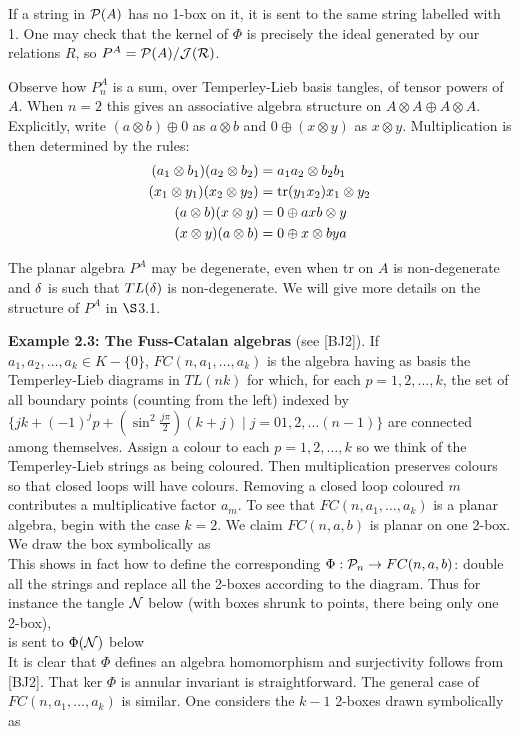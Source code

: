 If a string in $\P(A)$ has no 1-box on it, it is sent to the same
string labelled with 1. One may check that the kernel of $\Phi$ is
precisely the ideal generated by our relations $R$, so
$P^A=\P(A)/\cal J(R)$.

Observe how $P^A_n$ is a sum, over Temperley-Lieb basis tangles, of
tensor powers of $A$. When $n\!=\!2$ this gives an associative
algebra structure on $A\otimes A\oplus A\otimes A$. Explicitly,
write $(a\otimes b)\oplus 0$ as $a\otimes b$ and $0\oplus (x\otimes y)$
as $x\otimes y$. Multiplication is then determined by the rules:
\begin{eqnarray*}
(a_1\otimes b_1)(a_2\otimes b_2) & = a_1a_2\otimes b_2b_1 \\
(x_1\otimes y_1)(x_2\otimes y_2) & = {\op{tr}}(y_1x_2)x_1\otimes
y_2 \\
(a\otimes b)(x\otimes y) & = 0\oplus axb\otimes y \\
(x\otimes y)(a\otimes b) & = 0\oplus x\otimes bya
\end{eqnarray*}

The planar algebra $P^A$ may be degenerate,
even when tr on $A$ is non-degenerate and $\d$ is such that
$TL(\d)$ is non-degenerate. We will give more details on the
structure of $P^A$ in $\S$3.1.


\bigskip
{\bf Example 2.3: The Fuss-Catalan algebras} (see [BJ2]).
If $a_1,a_2,\dots ,a_k\in K-\{0\}$, $FC(n,a_1,\dots ,a_k)$ is the
algebra having as basis the Temperley-Lieb diagrams in $TL(nk)$ for
which, for each $p=1,2,\dots ,k$, the set of all boundary points
(counting from the left) indexed by
$\{jk+(-1)^jp+(\sin^2\frac{j\pi}{2})(k+j)\mid j=01,2,\dots (n-1)\}$
are connected among themselves. Assign a colour to each $p=1,2,\dots
,k$ so we think of the Temperley-Lieb strings as being coloured.
Then multiplication preserves colours so that closed loops will have
colours. Removing a closed loop coloured $m$ contributes a
multiplicative factor $a_m$. To see that $FC(n,a_1,\dots ,a_k)$ is
a planar algebra, begin with the case $k=2$. We claim $FC(n,a,b)$
is planar on one 2-box. We draw the box symbolically as
\[
        
\]
This shows in fact how to define the corresponding 
$\Phi: {\cal P}_n\to FC(n,a,b)$: double all the strings and replace all the
2-boxes according to the diagram. Thus for instance the tangle 
$\cal N$ below (with boxes shrunk to points, there being only one
2-box),
\[
        
\]
is sent to $\Phi(\cal N)$ below
\[
        
\]
\noindent It is clear that $\Phi$ defines an algebra homomorphism
and surjectivity follows from [BJ2]. That ker
$\Phi$ is annular invariant is straightforward.
The general case of $FC(n,a_1,\dots ,a_k)$ is similar.
One considers the $k-1$ 2-boxes drawn symbolically as
\[
        
\]

